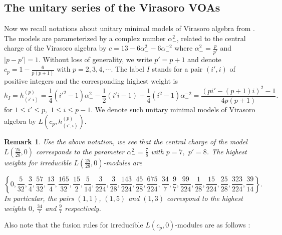 \documentclass{article}
\newtheorem{remark}[lemma]{Remark}
\begin{document}
	\subsection{\label{subsec:The-unitary-series}The unitary series of the Virasoro
		VOAs}
	
	Now we recall notations about unitary minimal models of Virasoro algebra
	from \cite{FFK}. The models are parameterized by a complex number
	$\alpha_{-}^{2}$, related to the central charge of the Virasoro algebra
	by $c=13-6\alpha_{-}^{2}-6\alpha_{-}^{-2}$ where $\alpha_{-}^{2}=\frac{p}{p'}$
	and $\left|p-p'\right|=1.$ Without loss of generality, we write $p'=p+1$
	and denote $c_{p}=1-\frac{6}{p\left(p+1\right)}$ with $p=2,3,4,\cdots$.
	The label $I$ stands for a pair $\left(i',i\right)$ of positive
	integers and the corresponding highest weight is
	\begin{equation}
		h_{I}=h_{\left(i'\ i\right)}^{\left(p\right)}=\frac{1}{4}\left(i'^{2}-1\right)\alpha_{-}^{2}-\frac{1}{2}\left(i'i-1\right)+
		\frac{1}{4}\left(i^{2}-1\right)\alpha_{-}^{-2}=\frac{\left(pi'-\left(p+1\right)i\right)^{2}-1}{4p\left(p+1\right)}.\label{minimal model notation}
	\end{equation}
	for $1\le i'\le p,$ $1\le i\le p-1.$ We denote such unitary minimal
	models of Virasoro algebra by $L\left(c_{p},h_{\left(i',i\right)}^{\left(p\right)}\right).$
	
	\begin{remark} \label{pairs corr. to U's weights for unitary model}Use
		the above notation, we see that the central charge of the model $L\left(\frac{25}{28},0\right)$
		corresponds to the parameter $\alpha_{-}^{2}=\frac{7}{8}$ with $p=7,$
		$p'=8$. The highest weights for irreducible $L\left(\frac{25}{28},0\right)$-modules
		are
		
		\begin{equation}
			\left\{ 0,\frac{5}{32},\frac{3}{4},\frac{57}{32},\frac{13}{4},\frac{165}{32},\frac{15}{2},\frac{5}{14},\frac{3}{224},
			\frac{3}{28},\frac{143}{224},\frac{45}{28},\frac{675}{224},\frac{34}{7},\frac{9}{7},\frac{99}{224},\frac{1}{28},\frac{15}{224},\frac{25}{28},\frac{323}{224},
			\frac{39}{14}\right\} .\label{highest weights for 25/28}
		\end{equation}
		In particular, the pairs $\left(1,1\right)$, $\left(1,5\right)$
		and $\left(1,3\right)$ correspond to the highest weights $0$, $\frac{34}{7}$
		and $\frac{9}{7}$ respectively. \end{remark}
	
	Also note that the fusion rules for irreducible $L\left(c_{p},0\right)$-modules
	are as follows \cite{W}:
	
\end{document}
